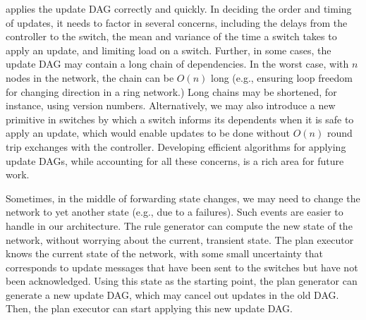 
 applies the update DAG correctly and quickly. In deciding the order and timing of updates, it needs to factor in several concerns, including the delays from the controller to the switch, the mean and variance of the time a switch takes to apply an update, and limiting load on a switch. Further, in some cases, the update DAG may contain a long chain of dependencies. In the worst case, with $n$ nodes in the network, the chain can be $O(n)$ long (e.g., ensuring loop freedom for changing direction in a ring network.)
Long chains may be shortened, for instance, using version numbers.  Alternatively, we may also introduce a new primitive in switches by which a switch informs its dependents when it is safe to apply an update, which would enable updates to be done without $O(n)$ round trip exchanges with the controller. Developing efficient algorithms for applying update DAGs, while accounting for all these concerns, is a rich area for future work.

Sometimes, in the middle of forwarding state changes, we may need to change the network to yet another state (e.g., due to a failures). Such events are easier to handle in our architecture. The rule generator can compute the new state of the network, without worrying about the current, transient state. The plan executor knows the current state of the network, with some small uncertainty that corresponds to update messages that have been sent to the switches but have not been acknowledged. Using this state as the starting point, the plan generator can generate a new update DAG, which may cancel out updates in the old DAG. Then, the plan executor can start applying this new update DAG.


